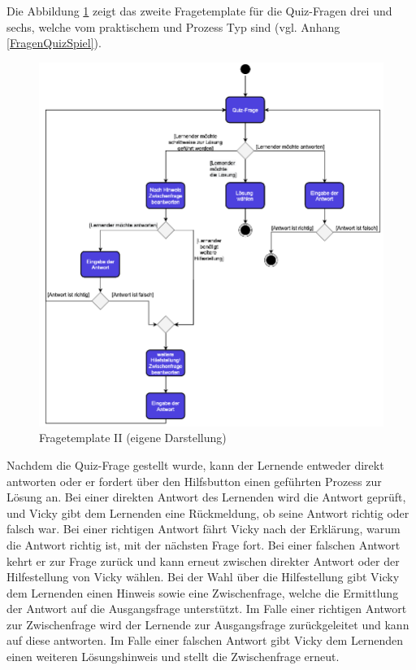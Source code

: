 Die Abbildung \ref{fig:Fragetemplate_II} zeigt das zweite Fragetemplate für die Quiz-Fragen drei und sechs, welche vom praktischem und Prozess Typ sind
(vgl. Anhang \ref{FragenQuizSpiel}). 
\begin{figure}[H]
  \centering
  \includegraphics[width=0.9\linewidth]{images/templateII.png}
  \caption[Fragetemplate II]{Fragetemplate II  (eigene Darstellung)}
  \label{fig:Fragetemplate_II}
\end{figure} 
Nachdem die Quiz-Frage gestellt wurde, kann der Lernende entweder direkt antworten oder er fordert über den 
Hilfsbutton einen geführten Prozess zur Lösung an. Bei einer direkten Antwort des Lernenden wird die Antwort geprüft,
und Vicky gibt dem Lernenden eine Rückmeldung, ob seine Antwort richtig oder falsch war. Bei einer richtigen Antwort 
fährt Vicky nach der Erklärung, warum die Antwort richtig ist, mit der nächsten Frage fort. 
Bei einer falschen Antwort kehrt er zur Frage zurück und kann erneut zwischen direkter Antwort oder der Hilfestellung von 
Vicky wählen. 
Bei der Wahl über die Hilfestellung gibt Vicky dem Lernenden einen Hinweis sowie eine Zwischenfrage, welche die 
Ermittlung der Antwort auf die Ausgangsfrage unterstützt. Im Falle einer richtigen Antwort zur Zwischenfrage wird der Lernende 
zur Ausgangsfrage zurückgeleitet und kann auf diese antworten. 
Im Falle einer falschen Antwort gibt Vicky dem Lernenden einen weiteren Lösungshinweis und stellt die Zwischenfrage erneut.
